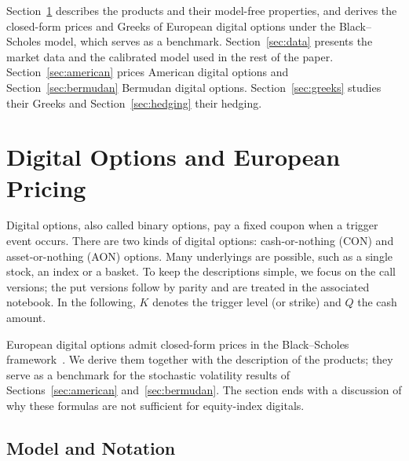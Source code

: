 \documentclass[11pt,a4paper]{article}
\theoremstyle{remark}
\begin{document}
Section~\ref{sec:products} describes the products and their model-free
properties, and derives the closed-form prices and Greeks of European digital
options under the Black--Scholes model, which serves as a benchmark.
Section~\ref{sec:data} presents the market data and the calibrated model used
in the rest of the paper. Section~\ref{sec:american} prices American digital options and
Section~\ref{sec:bermudan} Bermudan digital options.
Section~\ref{sec:greeks} studies their Greeks and Section~\ref{sec:hedging}
their hedging.

\section{Digital Options and European Pricing}
\label{sec:products}

Digital options, also called binary options, pay a fixed coupon when a trigger
event occurs. There are two kinds of digital options: cash-or-nothing (CON) and
asset-or-nothing (AON) options. Many underlyings are possible, such as a single
stock, an index or a basket. To keep the descriptions simple, we focus on the
call versions; the put versions follow by parity and are treated in the
associated notebook. In the following, $K$ denotes the trigger level (or
strike) and $Q$ the cash amount.

European digital options admit closed-form prices in the Black--Scholes
framework~\cite{BlackScholes1973,Merton1973}. We derive them together with the
description of the products; they serve as a benchmark for the stochastic
volatility results of Sections~\ref{sec:american} and~\ref{sec:bermudan}. The section ends with a
discussion of why these formulas are not sufficient for equity-index digitals.


\subsection{Model and Notation}
\label{subsec:bs-model}
\end{document}
